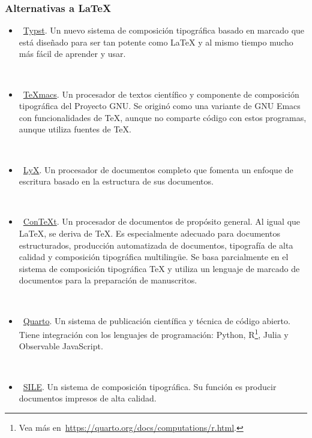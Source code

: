 \begin{frame}
	\frametitle{Alternativas a \LaTeX}

	\begin{itemize}[<+->]
		\item

		      ~\href{https://github.com/typst/typst}{Typst}.
		      Un nuevo sistema de composición tipográfica basado en
		      marcado que está diseñado para ser tan potente como
		      \LaTeX{} y al mismo tiempo mucho más fácil de aprender y
		      usar.

		      \

		\item

		      ~\href{https://github.com/texmacs/texmacs}{\TeX{}macs}.
		      Un procesador de textos científico y componente de
		      composición tipográfica del Proyecto GNU.
		      Se originó como una variante de GNU Emacs con
		      funcionalidades de \TeX, aunque no comparte código con
		      estos programas, aunque utiliza fuentes de \TeX.

		      \

		\item

		      ~\href{https://www.lyx.org}{LyX}.
		      Un procesador de documentos completo que fomenta un
		      enfoque de escritura basado en la estructura de sus documentos.

		      \

		\item

		      \textcolor{cyan}{}~\href{https://wiki.contextgarden.net}{Con\TeX{}t}. %
		      Un procesador de documentos de propósito general.
		      Al igual que \LaTeX, se deriva de \TeX.
		      Es especialmente adecuado para documentos
		      estructurados, producción automatizada de
		      documentos, tipografía de alta calidad y
		      composición tipográfica multilingüe.
		      Se basa parcialmente en el sistema de composición
		      tipográfica \TeX{} y utiliza un lenguaje de marcado
		      de documentos para la preparación de manuscritos.

		      \

		\item

		      ~\href{https://quarto.org}{Quarto}.
		      Un sistema de publicación científica y técnica de código
		      abierto.
		      Tiene integración con los lenguajes de programación:
		      Python, R\footnote{Vea más en~\url{https://quarto.org/docs/computations/r.html}.},
					Julia y Observable JavaScript.

		      \

		\item

		      ~\href{https://sile-typesetter.org}{SILE}.
		      Un sistema de composición tipográfica.
		      Su función es producir documentos impresos de alta calidad.
	\end{itemize}
\end{frame}
